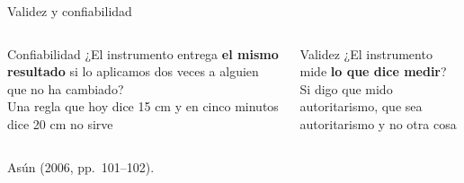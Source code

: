\documentclass[aspectratio=169,11pt]{beamer}
\newcommand{\hl}[1]{\textcolor{marino}{\textbf{#1}}}        %
\newcommand{\fuente}[1]{\par\vfill{\scriptsize\color{gris}#1\par}}
\newcommand{\diana}[3]{%
    \begin{scope}[shift={(#1,#2)}]
      \foreach \r/\c in {1.6/crema,1.1/marino!20,0.6/marino!40,0.2/marino} \fill[\c] (0,0) circle (\r);
      \draw[pizarra] (0,0) circle (1.6);
      \node[font=\scriptsize, align=center, text=pizarra] at (0,-2.2) {#3};
    \end{scope}}
\begin{document}
\begin{frame}{Validez y confiabilidad}
\begin{columns}[T]
\begin{block}{Confiabilidad}
\small
¿El instrumento entrega \textbf{el mismo resultado} si lo aplicamos dos veces a alguien que no ha cambiado?\\[4pt]
\footnotesize Una regla que hoy dice 15 cm y en cinco minutos dice 20 cm no sirve
\end{block}
\begin{block}{Validez}
\small
¿El instrumento mide \textbf{lo que dice medir}?\\[4pt]
\footnotesize Si digo que mido autoritarismo, que sea autoritarismo y no otra cosa
\end{block}
\end{columns}
\bigskip
\centering
{}
\fuente{Asún (2006, pp.~101--102).}
\end{frame}
\end{document}
